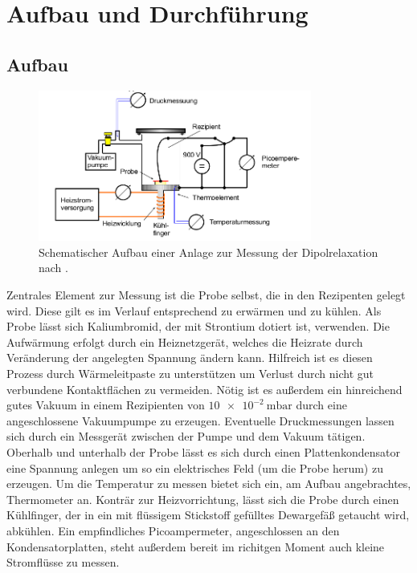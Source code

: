 \section{Aufbau und Durchführung}
\subsection{Aufbau}
\begin{figure}
    \centering
    \includegraphics[width=0.8\textwidth]{bilder/Aufbau.png}
    \caption{Schematischer Aufbau einer Anlage zur Messung der Dipolrelaxation nach
            \cite{skript}.}
    \label{fig:aufbau}
\end{figure}

Zentrales Element zur Messung ist die Probe selbst, die in den Rezipenten gelegt wird. Diese gilt es im Verlauf entsprechend
zu erwärmen und zu kühlen. Als Probe lässt sich Kaliumbromid, der mit Strontium
dotiert ist, verwenden. Die Aufwärmung erfolgt durch ein Heiznetzgerät, welches die Heizrate durch Veränderung der angelegten Spannung ändern kann.
Hilfreich ist es diesen Prozess durch Wärmeleitpaste zu unterstützen um
Verlust durch nicht gut verbundene Kontaktflächen zu vermeiden.
Nötig ist es außerdem ein hinreichend gutes Vakuum in einem Rezipienten von $\SI{10e-2}{\milli\bar}$ 
durch eine angeschlossene Vakuumpumpe zu erzeugen.
Eventuelle Druckmessungen  lassen sich durch ein Messgerät zwischen der Pumpe und dem Vakuum tätigen.
Oberhalb und unterhalb der Probe lässt es sich durch einen Plattenkondensator eine Spannung anlegen um so ein 
elektrisches Feld (um die Probe herum) zu erzeugen. Um die Temperatur zu messen bietet sich ein, am Aufbau angebrachtes, Thermometer an.
Konträr zur Heizvorrichtung, lässt sich die Probe durch einen Kühlfinger, der in ein mit flüssigem Stickstoff gefülltes Dewargefäß getaucht wird, 
abkühlen.
Ein empfindliches Picoampermeter, angeschlossen an den Kondensatorplatten, steht außerdem bereit im richitgen Moment auch kleine
Stromflüsse zu messen.

